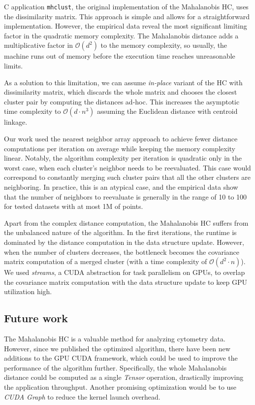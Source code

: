C application \texttt{mhclust}, the original implementation of the Mahalanobis HC, uses the dissimilarity matrix. This approach is simple and allows for a straightforward implementation. However, the empirical data reveal the most significant limiting factor in the quadratic memory complexity. The Mahalanobis distance adds a multiplicative factor in $\mathcal{O}(d^2)$ to the memory complexity, so usually, the machine runs out of memory before the execution time reaches unreasonable limits.

As a solution to this limitation, we can assume \emph{in-place} variant of the HC with dissimilarity matrix, which discards the whole matrix and chooses the closest cluster pair by computing the distances ad-hoc. This increases the asymptotic time complexity to $\mathcal{O}(d \cdot n^3)$ assuming the Euclidean distance with centroid linkage.

Our work used the nearest neighbor array approach to achieve fewer distance computations per iteration on average while keeping the memory complexity linear. Notably, the algorithm complexity per iteration is quadratic only in the worst case, when each cluster's neighbor needs to be reevaluated. This case would correspond to constantly merging such cluster pairs that all the other clusters are neighboring. In practice, this is an atypical case, and the empirical data show that the number of neighbors to reevaluate is generally in the range of 10 to 100 for tested datasets with at most 1M of points.

Apart from the complex distance computation, the Mahalanobis HC suffers from the unbalanced nature of the algorithm. In the first iterations, the runtime is dominated by the distance computation in the data structure update. However, when the number of clusters decreases, the bottleneck becomes the covariance matrix computation of a merged cluster (with a time complexity of $\mathcal{O}(d^2 \cdot n)$). We used \emph{streams}, a CUDA abstraction for task parallelism on GPUs, to overlap the covariance matrix computation with the data structure update to keep GPU utilization high.

\subsection{Future work}

The Mahalanobis HC is a valuable method for analyzing cytometry data. However, since we published the optimized algorithm, there have been new additions to the GPU CUDA framework, which could be used to improve the performance of the algorithm further. Specifically, the whole Mahalanobis distance could be computed as a single \emph{Tensor} operation, drastically improving the application throughput. Another promising optimization would be to use \emph{CUDA Graph} to reduce the kernel launch overhead.


